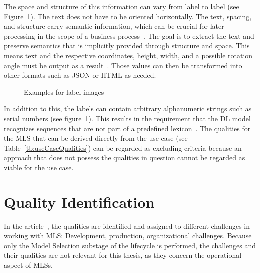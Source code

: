 The space and structure of this information can vary from label to label (see
Figure~\ref{fig:examples}).
The text does not have to be oriented horizontally.
The text, spacing, and structure carry semantic information, which can be crucial for later
processing in the scope of a business process~\citep{chen_text_2021}.
The goal is to extract the text and preserve semantics that is implicitly provided through
structure and space.
This means text and the respective coordinates, height, width, and a possible rotation angle must
be output as a result~\citep{yang_learning_2021}.
Those values can then be transformed into other formats such as JSON or HTML as needed.
\begin{figure}[h]
    \centering
    \caption{Examples for label images\label{fig:examples}}
\end{figure}

In addition to this, the labels can contain arbitrary alphanumeric strings such as serial numbers
(see figure~\ref{fig:examples}).
This results in the requirement that the \ac{DL} model recognizes sequences that
are not part of a predefined lexicon~\citep{ghosh_visual_2017,chen_text_2021}.
The qualities for the \ac{MLS} that can be derived directly from the use case (see
Table~\ref{tb:useCaseQualities}) can be regarded as excluding criteria because an approach
that does not possess the qualities in question cannot be regarded as viable for the use case.

\section{Quality Identification}
In the article~\cite{ashmore_assuring_2021}, the qualities are identified and assigned to different
challenges in working with \ac{MLS}: Development, production,
organizational challenges.
Because only the Model Selection substage of the lifecycle is performed, the challenges and their
qualities are not relevant for this thesis, as they concern the operational aspect of \acp{MLS}.

